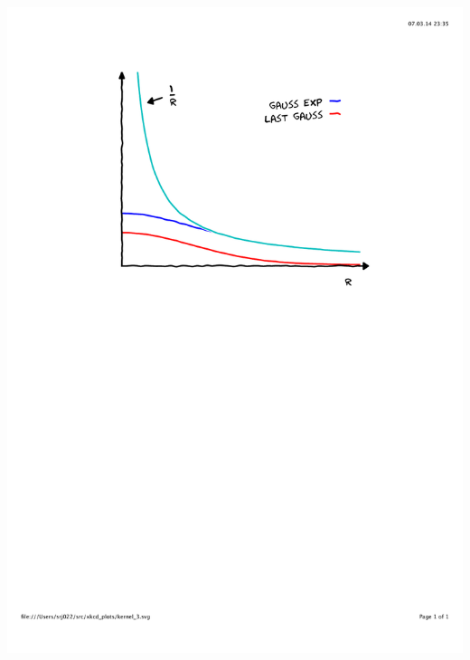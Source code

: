 \begin{frame}
\begin{columns}
\begin{column}{.50\textwidth}
{        \includegraphics[scale=0.4, clip, viewport = 110 450 490 800]
            {figures/kernel_3.pdf}}
\end{column}
\end{columns}
\end{frame}
